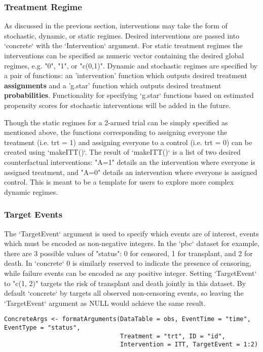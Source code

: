 \documentclass{report}
\newcommand{\1}{\ensuremath{\mathbf{1}}}
\begin{document}
\subsubsection{Treatment Regime}
As discussed in the previous section, interventions may take the form of stochastic, dynamic, or static regimes. Desired interventions are passed into `concrete` with the `Intervention` argument. For static treatment regimes the interventions can be specified as numeric vector containing the desired global regimes, e.g. "0", "1", or "c(0,1)". Dynamic and stochastic regimes are specified by a pair of functions: an 'intervention' function which outputs desired treatment \textbf{assignments} and a 'g.star' function which outputs desired treatment \textbf{probabilities}. Functionality for specifying `g.star` functions based on estimated propensity scores for stochastic interventions will be added in the future.

Though the static regimes for a 2-armed trial can be simply specified as mentioned above, the functions corresponding to assigning everyone the treatment (i.e. trt = 1) and assigning everyone to a control (i.e. trt = 0) can be created using `makeITT()`. The result of `makeITT()` is a list of two desired counterfactual interventions: "A=1" details an the intervention where everyone is assigned treatment, and "A=0" details an intervention where everyone is assigned control. This is meant to be a template for users to explore more complex dynamic regimes.

\subsubsection{Target Events}
The `TargetEvent` argument is used to specify which events are of interest, events which must be encoded as non-negative integers. In the `pbc` dataset for example, there are 3 possible values of "status": 0 for censored, 1 for transplant, and 2 for death. In `concrete` 0 is similarly reserved to indicate the presence of censoring, while failure events can be encoded as any positive integer. Setting `TargetEvent` to "c(1, 2)" targets the risk of transplant and death jointly in this dataset. By default `concrete` by targets all observed non-censoring events, so leaving the `TargetEvent` argument as NULL would achieve the same result.

\begin{lstlisting}
ConcreteArgs <- formatArguments(DataTable = obs, EventTime = "time", EventType = "status", 
                                Treatment = "trt", ID = "id", 
                                Intervention = ITT, TargetEvent = 1:2)
\end{lstlisting}
\end{document}
